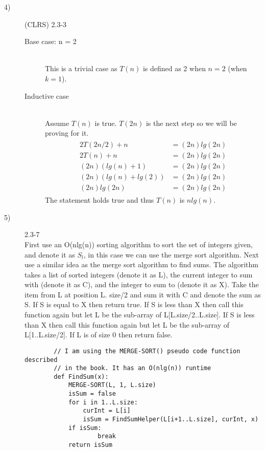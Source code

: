 \documentclass[paper=a4, fontsize=11pt]{scrartcl} %
\numberwithin{equation}{section} %
\numberwithin{figure}{section} %
\numberwithin{table}{section} %
\begin{document}
\begin{description}
\begin{tabular}{ c | c | c | c | c | c | c }
        \end{tabular}
    \item[4)] (CLRS) 2.3-3 \hfill \\
        \begin{description}
            \item[Base case: n = 2] \hfill \\
                This is a trivial case as $T(n)$ is defined as 2 when $n = 2$ (when $k = 1$).
            \item[Inductive case] \hfill \\
                Assume $T(n)$ is true. $T(2n)$ is the next step so we will be proving for it.
                \begin{align} 
                \begin{split}
                    2T(2n/2) + n    &= (2n)lg(2n)\\
                    2T(n) + n       &= (2n)lg(2n)\\
                    (2n)(lg(n) + 1)       &= (2n)lg(2n)\\
                    (2n)(lg(n) + lg(2)) &= (2n)lg(2n)\\
                    (2n)lg(2n) &= (2n)lg(2n)
                \end{split}                 
                \end{align}
                The statement holds true and thus $T(n)$ is $nlg(n)$.
        \end{description}
    \item[5)] 2.3-7 \hfill \\
        First use an O(nlg(n)) sorting algorithm to sort the set of integers given, and denote it as $S_l$, in
        this case we can use the merge sort algorithm. Next use a similar idea as the merge sort algorithm to
        find sums. The algorithm takes a list of sorted integers (denote it as L), the current integer to sum 
        with (denote it as C), and the integer to sum to (denote it as X). Take the item from L at position L.
        size/2 and sum it with C and denote the sum as S. If S is equal to X then return true. If S is less 
        than X then call this function again but let L be the sub-array of L[L.size/2..L.size]. If S is less 
        than X then call this function again but let L be the sub-array of L[1..L.size/2]. If L is of size 0 
        then return false.

        \begin{lstlisting}
        // I am using the MERGE-SORT() pseudo code function described 
        // in the book. It has an O(nlg(n)) runtime
        def FindSum(x):
            MERGE-SORT(L, 1, L.size)
            isSum = false
            for i in 1..L.size:
                curInt = L[i]
                isSum = FindSumHelper(L[i+1..L.size], curInt, x)
            if isSum:
                    break
            return isSum
        

\end{lstlisting}
\end{description}
\end{document}
